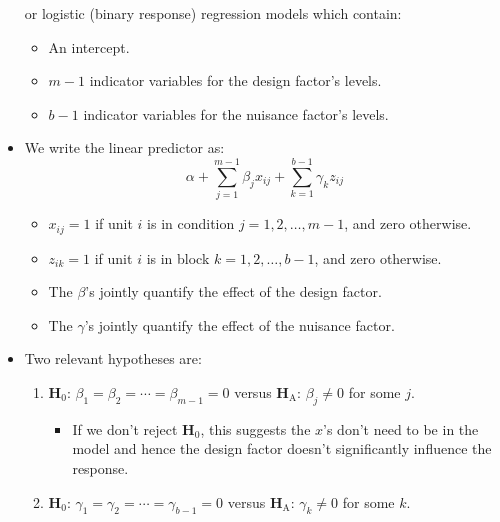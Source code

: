 \begin{itemize}
            or logistic (binary response) regression models which contain:
            \begin{itemize}
                  \item An intercept.
                  \item $ m-1 $ indicator variables for the design factor's levels.
                  \item $ b-1 $ indicator variables for the nuisance factor's levels.
            \end{itemize}
      \item We write the linear predictor as:
            \begin{equation}\tag{$\star$}
                  \alpha+\sum_{j=1}^{m-1} \beta_j x_{ij}+\sum_{k=1}^{b-1} \gamma_k z_{ij}\label{lpeqn}
            \end{equation}
            \begin{itemize}
                  \item $ x_{ij}=1 $ if unit $ i $ is in condition $ j=1,2,\ldots,m-1 $, and zero otherwise.
                  \item $ z_{ik}=1 $ if unit $ i $ is in block $ k=1,2,\ldots,b-1 $, and zero otherwise.
                  \item The $ \beta $'s jointly quantify the effect of the design factor.
                  \item The $ \gamma $'s jointly quantify the effect of the nuisance factor.
            \end{itemize}
      \item Two relevant hypotheses are:
            \begin{enumerate}[(1)]
                  \item $ \mathbf{H}_0 $: $ \beta_1=\beta_2=\cdots=\beta_{m-1}=0 $ versus $ \mathbf{H}_\text{A} $: $ \beta_j\ne 0 $ for some $ j $.
                        \begin{itemize}
                              \item If we don't reject $ \mathbf{H}_0 $, this suggests the $ x $'s don't need to be in the model
                                    and hence the design factor doesn't significantly influence the response.
                        \end{itemize}
                  \item $ \mathbf{H}_0 $: $ \gamma_1=\gamma_2=\cdots=\gamma_{b-1}=0 $ versus $ \mathbf{H}_\text{A} $: $ \gamma_k\ne 0 $ for some $ k $.
                        \begin{itemize}

\end{itemize}
\end{enumerate}
\end{itemize}

